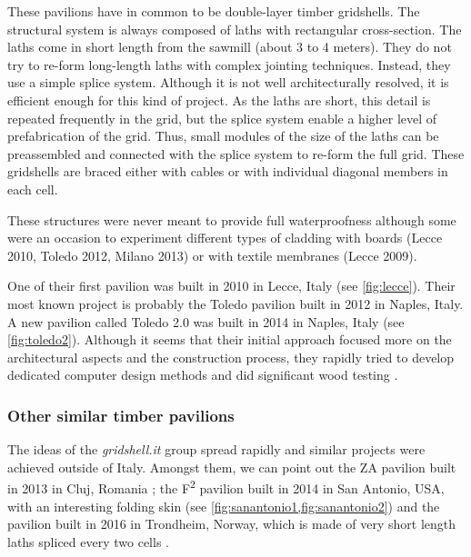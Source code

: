 These pavilions have in common to be double-layer timber gridshells. The structural system is always composed of laths with rectangular cross-section. The laths come in short length  from the sawmill (about 3 to 4 meters). They do not try to re-form long-length laths with complex jointing techniques. Instead, they use a simple splice system. Although it is not well architecturally resolved, it is efficient enough for this kind of project. As the laths are short, this detail is repeated frequently in the grid, but the splice system enable a higher level of prefabrication of the grid. Thus, small modules of the size of the laths can be preassembled and connected with the splice system to re-form the full grid. These gridshells are braced either with cables or with individual diagonal members in each cell.

These structures were never meant to provide full waterproofness although some were an occasion to experiment different types of cladding with boards (Lecce 2010, Toledo 2012, Milano 2013) or with textile membranes (Lecce 2009).

One of their first pavilion was built in 2010 in Lecce, Italy (see \cref{fig:lecce}). Their most known project is probably the Toledo pavilion built in 2012 in Naples, Italy.  A new pavilion called Toledo 2.0 was built in 2014 in Naples, Italy (see \cref{fig:toledo2}). Although it seems that their initial approach focused more on the architectural aspects and the construction process, they rapidly tried to develop dedicated computer design methods \cite{DAmico2014} and did significant wood testing \cite{DAmico2015a}.

\subsubsection{Other similar timber pavilions}
The ideas of the \emph{gridshell.it} group spread rapidly and similar projects were achieved outside of Italy. Amongst them, we can point out the ZA pavilion built in 2013 in Cluj, Romania \cite{Naicu2014}; the F\textsuperscript{2} pavilion built in 2014 in San Antonio, USA, with an interesting folding skin (see \cref{fig:sanantonio1,fig:sanantonio2}) and the pavilion built in 2016 in Trondheim, Norway, which is made of very short length laths spliced every two cells \cite{Mork2016,Labonnote2016}.


